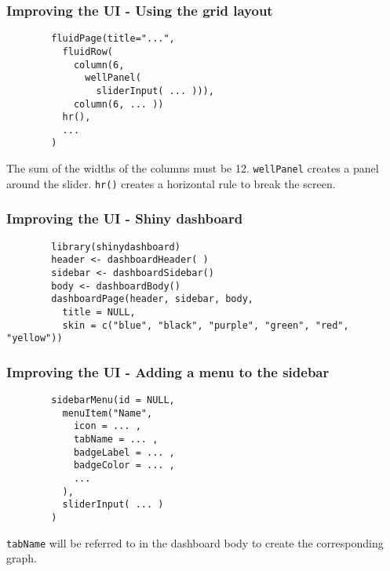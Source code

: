 \documentclass{beamer}
\begin{document}
	\begin{frame}[fragile]
		\frametitle{Improving the UI - Using the grid layout}
		
		\begin{exampleblock}{}
		\begin{BVerbatim}
		fluidPage(title="...",
		  fluidRow(
		    column(6,
		      wellPanel(
		        sliderInput( ... ))),
		    column(6, ... ))
		  hr(),
		  ...
		)      
		\end{BVerbatim}
		\end{exampleblock}{}

		\vspace{1em}

		The sum of the  widths of the columns must be 12. \verb|wellPanel| creates a panel around the slider. \verb|hr()| creates a horizontal rule to break the screen.

	\end{frame}

	\begin{frame}[fragile]
		\frametitle{Improving the UI - Shiny dashboard}
		
		\begin{exampleblock}{}
		\begin{BVerbatim}
		library(shinydashboard)
		header <- dashboardHeader( )
		sidebar <- dashboardSidebar()
		body <- dashboardBody()
		dashboardPage(header, sidebar, body,
		  title = NULL,
		  skin = c("blue", "black", "purple", "green", "red", "yellow"))
		\end{BVerbatim}
		\end{exampleblock}{}

	\end{frame}

	\begin{frame}[fragile]
		\frametitle{Improving the UI - Adding a menu to the sidebar}
		
		\begin{exampleblock}{}
		\begin{BVerbatim}
		sidebarMenu(id = NULL,
		  menuItem("Name",
		    icon = ... ,
		    tabName = ... ,
		    badgeLabel = ... ,
		    badgeColor = ... ,
		    ...
		  ),
		  sliderInput( ... )
		)
		\end{BVerbatim}
		\end{exampleblock}{}

		\vspace{1em}

		\verb|tabName| will be referred to in the dashboard body to create the corresponding graph.

	\end{frame}
\end{document}

